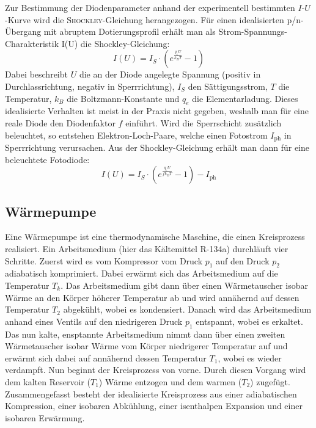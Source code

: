 \documentclass[english, ngerman]{scrartcl}
\begin{document}
Zur Bestimmung der Diodenparameter anhand der experimentell bestimmten $I$-$U$-Kurve wird die \textsc{Shockley}-Gleichung herangezogen.
Für einen idealisierten p/n-Übergang mit abruptem Dotierungsprofil erhält man als Strom-Spannungs-Charakteristik I(U) die Shockley-Gleichung:
%
\begin{equation}
    \label{eq:shockley}
    I(U) = I_S \cdot \left( e^{\frac{q_e U}{k_B T}} - 1 \right)
\end{equation}
%
Dabei beschreibt $U$ die an der Diode angelegte Spannung (positiv in Durchlassrichtung, negativ in Sperrrichtung), $I_S$ den Sättigungsstrom, $T$ die Temperatur, $k_B$ die Boltzmann-Konstante und $q_e$ die Elementarladung. Dieses idealisierte Verhalten ist
meist in der Praxis nicht gegeben, weshalb man für eine reale Diode den Diodenfaktor $f$ einführt.
Wird die Sperrschicht zusätzlich beleuchtet, so entstehen Elektron-Loch-Paare, welche einen Fotostrom $I_{\text{ph}}$ in Sperrrichtung verursachen. Aus der Shockley-Gleichung erhält man dann für eine beleuchtete Fotodiode:
%
\begin{equation}
    \label{eq:shockley_beleuchtet}
    I(U) = I_S \cdot \left( e^{\frac{q_e U}{f k_B T}} - 1 \right) - I_{\text{ph}}
\end{equation}


\subsection{Wärmepumpe}
\label{subsec:grundlagen_waermepumpe}

Eine Wärmepumpe ist eine thermodynamische Maschine, die einen Kreisprozess realisiert. Ein Arbeitsmedium (hier das Kältemittel R-134a) durchläuft vier Schritte. Zuerst wird es vom Kompressor vom Druck $p_1$ auf den Druck $p_2$ adiabatisch komprimiert. Dabei erwärmt sich
das Arbeitsmedium auf die Temperatur $T_k$. Das Arbeitsmedium gibt dann über einen Wärmetauscher isobar Wärme an den Körper höherer Temperatur ab und wird annähernd auf dessen Temperatur $T_2$ abgekühlt, wobei es kondensiert. Danach wird das Arbeitsmedium
anhand eines Ventils auf den niedrigeren Druck $p_1$ entspannt, wobei es erkaltet. Das nun kalte, ensptannte Arbeitsmedium nimmt dann über einen zweiten Wärmetauscher isobar Wärme vom Körper niedrigerer Temperatur auf und erwärmt sich dabei auf annähernd dessen Temperatur $T_1$, wobei es wieder verdampft. Nun beginnt der Kreisprozess von vorne. Durch diesen Vorgang
wird dem kalten Reservoir ($T_1$) Wärme entzogen und dem warmen ($T_2$) zugefügt. Zusammengefasst besteht der idealisierte Kreisprozess aus einer adiabatischen Kompression, einer isobaren Abkühlung, einer isenthalpen Expansion und einer isobaren Erwärmung.
\end{document}
